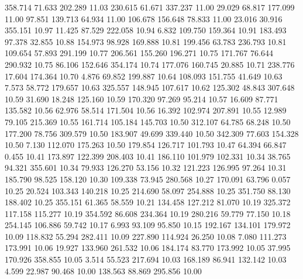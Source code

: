  358.714   71.633  202.289        11.03
 230.615   61.671  337.237        11.00
  29.029   68.817  177.099        11.00
  97.851  139.713   64.934        11.00
 106.678  156.648   78.833        11.00
  23.016   30.916  355.151        10.97
  11.425   87.529  222.058        10.94
   6.832  109.750  159.364        10.91
 183.493   97.378   32.855        10.88
 154.973   98.928  169.888        10.81
 199.456   63.783  236.793        10.81
 109.654   57.893  291.199        10.77
 206.561  155.260  196.271        10.75
 171.767   76.644  290.932        10.75
  86.106  152.646  354.174        10.74
 177.076  160.745   20.885        10.71
 238.776   17.604  174.364        10.70
   4.876   69.852  199.887        10.64
 108.093  151.755   41.649        10.63
   7.573   58.772  179.657        10.63
 325.557  148.945  107.617        10.62
 125.302   48.843  307.648        10.59
  31.690   18.248  125.160        10.59
 170.320   97.269   95.214        10.57
  16.609   87.771  135.582        10.56
  62.976   58.514  171.504        10.56
  16.392  102.974  207.891        10.55
  12.989   79.105  215.369        10.55
 161.714  105.184  145.703        10.50
 312.107   64.785   68.248        10.50
 177.200   78.756  309.579        10.50
 183.907   49.699  339.440        10.50
 342.309   77.603  154.328        10.50
   7.130  112.070  175.263        10.50
 179.854  126.717  101.793        10.47
  64.394   66.847    0.455        10.41
 173.897  122.399  208.403        10.41
 186.110  101.979  102.331        10.34
  38.765   94.321  355.601        10.34
  79.933  126.270   53.156        10.32
 121.223  126.995   97.264        10.31
 185.790   98.525  158.120        10.30
 109.338   73.945  280.568        10.27
 170.091   63.796    0.057        10.25
  20.524  103.343  140.218        10.25
 214.690   58.097  254.888        10.25
 351.750   88.130  188.402        10.25
 355.151   61.365   58.559        10.21
 134.458  127.212   81.070        10.19
 325.372  117.158  115.277        10.19
 354.592   86.608  234.364        10.19
 280.216   59.779   77.150        10.18
 254.145  106.886   59.742        10.17
   6.993   93.109   95.850        10.15
 192.167  134.101  179.972        10.09
 118.832   55.294  282.411        10.09
 227.890  114.924   26.250        10.08
   7.080  111.273  173.991        10.06
  19.927  133.960  261.532        10.06
 184.174   83.770  173.992        10.05
  37.995  170.926  358.855        10.05
   3.514   55.523  217.694        10.03
 168.189   86.941  132.142        10.03
   4.599   22.987   90.468        10.00
 138.563   88.869  295.856        10.00
